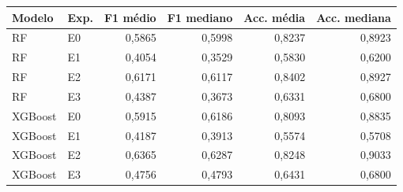 \begin{tabular}{llrrrr}
\toprule
Modelo & Exp. & F1 médio & F1 mediano & Acc. média & Acc. mediana \\
\midrule
RF & E0 & 0,5865 & 0,5998 & 0,8237 & 0,8923 \\
RF & E1 & 0,4054 & 0,3529 & 0,5830 & 0,6200 \\
RF & E2 & 0,6171 & 0,6117 & 0,8402 & 0,8927 \\
RF & E3 & 0,4387 & 0,3673 & 0,6331 & 0,6800 \\
\midrule
XGBoost & E0 & 0,5915 & 0,6186 & 0,8093 & 0,8835 \\
XGBoost & E1 & 0,4187 & 0,3913 & 0,5574 & 0,5708 \\
XGBoost & E2 & 0,6365 & 0,6287 & 0,8248 & 0,9033 \\
XGBoost & E3 & 0,4756 & 0,4793 & 0,6431 & 0,6800 \\
\bottomrule
\end{tabular}

